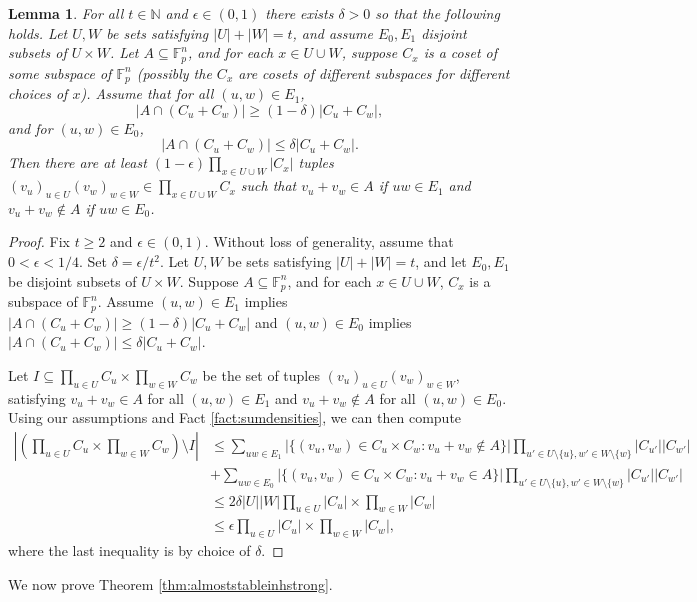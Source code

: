 \documentclass[12pt,oneside,british,a4wide]{amsart}
\newtheorem{lemma}[theorem]{Lemma}
\numberwithin{equation}{section}
\theoremstyle{definition}
\def\F{\mathbb{F}}
\def\e{\epsilon}
\begin{document}
\begin{lemma}\label{lem:graphcounting1}
For all $t\in \mathbb{N}$ and $\e\in (0,1)$ there exists $\delta>0$ so that the following holds.  Let $U,W$ be sets satisfying $|U|+|W|=t$, and assume $E_0,E_1$ disjoint subsets of $U\times W$.  Let $A\subseteq \mathbb{F}_p^n$, and for each $x\in U\cup W$, suppose $C_x$ is a coset of some subspace of $\F_p^{n}$ (possibly the $C_x$ are cosets of different subspaces for different choices of $x$). Assume that for all $(u,w)\in E_1$, 
 $$
|A\cap (C_u+C_w)|\geq (1-\delta)|C_u+C_w|,
 $$
 and for $(u,w)\in E_0$, 
 $$
 |A\cap (C_u+C_w)|\leq \delta|C_u+C_w|.
 $$
 Then there are at least $(1-\e)\prod_{x\in U\cup W}|C_x|$ tuples $(v_u)_{u\in U}(v_w)_{w\in W}\in \prod_{x\in U\cup W}C_x$ such that $v_u+v_w\in A$ if $uw\in E_1$ and $v_u+v_w\notin A$ if $uw\in E_0$.   
\end{lemma}
\begin{proof}
Fix $t\geq 2$ and $\e\in (0,1)$.  Without loss of generality, assume that $0<\e<1/4$. Set $\delta=\e/t^2$.  Let $U,W$ be sets satisfying $|U|+|W|=t$, and let $E_0,E_1$ be disjoint subsets of $U\times W$. Suppose $A\subseteq \F_p^n$, and for each $x\in U\cup W$, $C_x$ is a subspace of $\F_p^n$.  Assume $(u,w)\in E_1$ implies $|A\cap (C_u+C_w)|\geq (1-\delta)|C_u+C_w|$ and $(u,w)\in E_0$ implies $|A\cap (C_u+C_w)|\leq \delta|C_u+C_w|$. 

 Let  $I\subseteq \prod_{u\in U}C_u\times \prod_{w\in W}C_w$ be the set of tuples $(v_{u})_{u\in U}(v_{w})_{w\in W}$, satisfying $v_{u}+v_{w}\in A$ for all $(u,w)\in E_1$ and  $v_{u}+v_{w}\notin A$ for all $(u,w)\in E_0$.  Using our assumptions and  Fact \ref{fact:sumdensities}, we can then compute 
\begin{align*}
|(\prod_{u\in U}C_u\times \prod_{w\in W}C_w)\setminus I|&\leq \sum_{uw\in E_1}|\{(v_u,v_w)\in C_u\times C_w: v_u+v_w\notin A\}|  \prod_{u'\in U\setminus \{u\}, w'\in W\setminus \{w\}}|C_{u'}||C_{w'}|\\
&+\sum_{uw\in E_0}|\{(v_u,v_w)\in C_u\times C_w: v_u+v_w\in A\}|  \prod_{u'\in U\setminus \{u\}, w'\in W\setminus \{w\}}|C_{u'}||C_{w'}|\\
&\leq 2 \delta|U||W| \prod_{u\in U}|C_u|\times \prod_{w\in W}|C_w|\\
&\leq \e \prod_{u\in U}|C_u|\times \prod_{w\in W}|C_w|,
\end{align*}
where the last inequality is by choice of $\delta$.
\end{proof}

We now prove Theorem \ref{thm:almoststableinhstrong}. 
\vspace{2mm}
\end{document}
